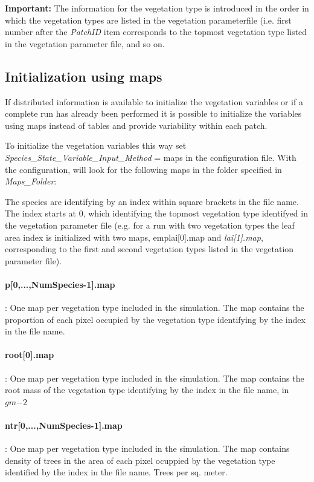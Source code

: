 \textbf{Important:} The information for the vegetation type is introduced in the order in which the vegetation types are listed in the vegetation parameterfile (i.e. first number after the \emph{PatchID} item corresponds to the topmost vegetation type listed in the vegetation parameter file, and so on. 


\subsection{Initialization using maps}

If distributed information is available to initialize the vegetation variables or if a complete run has already been performed it is possible to initialize the variables using maps instead of tables and provide variability within each patch.

To initialize the vegetation variables this way set \emph{Species\_State\_Variable\_Input\_Method} = maps in the configuration file. With the configuration, \echo will look for the following maps in the folder specified in  \emph{Maps\_Folder}:

The species are identifying by an index within square brackets in the file name. The index starts at 0, which identifying the topmost vegetation type identifyed in the vegetation parameter file (e.g. for a run with two vegetation types the leaf area index is initialized with two maps, emp{lai[0].map} and \emph{lai[1].map},  corresponding to the first and second vegetation types listed in the vegetation parameter file).  

\paragraph{p[0,...,NumSpecies-1].map}: One map per vegetation type included in the simulation. The map contains the proportion of each pixel occupied by the vegetation type identifying by the index in the file name.

\paragraph{root[0].map}: One map per vegetation type included in the simulation. The map contains the root mass of the vegetation type identifying by the index in the file name, in $gm{-2}$
 
\paragraph{ntr[0,...,NumSpecies-1].map}: One map per vegetation type included in the simulation. The map contains density of trees in the area of each pixel ocuppied by the vegetation type identified by the index in the file name. Trees per sq. meter.

